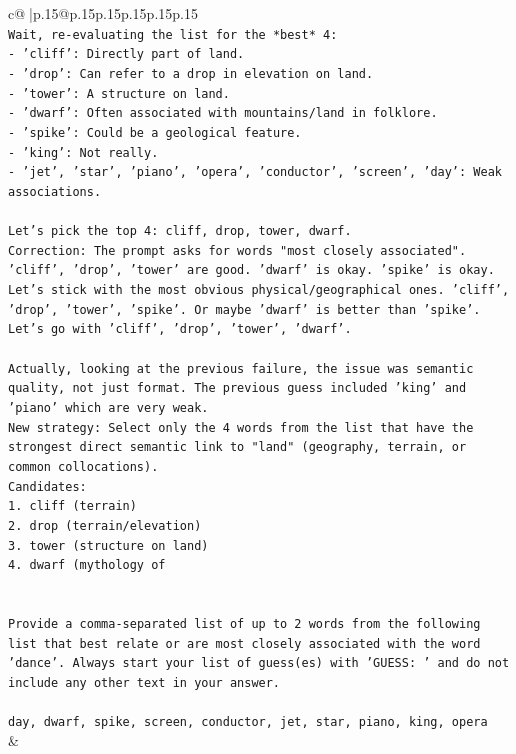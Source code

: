 \documentclass{article}
\begin{document}
{\begin{supertabular}{c@{$\;$}|p{.15\linewidth}@{}p{.15\linewidth}p{.15\linewidth}p{.15\linewidth}p{.15\linewidth}p{.15\linewidth}}
{{{\\ 
\texttt{Wait, re{-}evaluating the list for the *best* 4:} \\
\texttt{{-} 'cliff': Directly part of land.} \\
\texttt{{-} 'drop': Can refer to a drop in elevation on land.} \\
\texttt{{-} 'tower': A structure on land.} \\
\texttt{{-} 'dwarf': Often associated with mountains/land in folklore.} \\
\texttt{{-} 'spike': Could be a geological feature.} \\
\texttt{{-} 'king': Not really.} \\
\texttt{{-} 'jet', 'star', 'piano', 'opera', 'conductor', 'screen', 'day': Weak associations.} \\
\\ 
\texttt{Let's pick the top 4: cliff, drop, tower, dwarf.} \\
\texttt{Correction: The prompt asks for words "most closely associated". 'cliff', 'drop', 'tower' are good. 'dwarf' is okay. 'spike' is okay. Let's stick with the most obvious physical/geographical ones. 'cliff', 'drop', 'tower', 'spike'. Or maybe 'dwarf' is better than 'spike'. Let's go with 'cliff', 'drop', 'tower', 'dwarf'.} \\
\\ 
\texttt{Actually, looking at the previous failure, the issue was semantic quality, not just format. The previous guess included 'king' and 'piano' which are very weak.} \\
\texttt{New strategy: Select only the 4 words from the list that have the strongest direct semantic link to "land" (geography, terrain, or common collocations).} \\
\texttt{Candidates:} \\
\texttt{1. cliff (terrain)} \\
\texttt{2. drop (terrain/elevation)} \\
\texttt{3. tower (structure on land)} \\
\texttt{4. dwarf (mythology of} \\
\\ 
\\ 
\texttt{Provide a comma{-}separated list of up to 2 words from the following list that best relate or are most closely associated with the word 'dance'. Always start your list of guess(es) with 'GUESS: ' and do not include any other text in your answer.} \\
\\ 
\texttt{day, dwarf, spike, screen, conductor, jet, star, piano, king, opera} \\
            }
        }
    }
    & \\ \\


\end{supertabular}}
\end{document}
